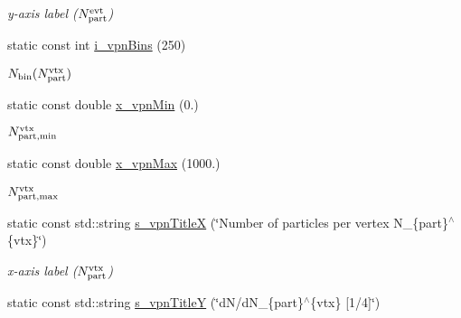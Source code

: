 \begin{CompactItemize}
\begin{CompactList}\small\item\em y-axis label ($N_{\rm part}^{\rm evt}$) \item\end{CompactList}\item 
\hypertarget{namespaceHistGroupCfg_9f8cb515970cf02b439c77ff897d597a}{
static const int \hyperlink{namespaceHistGroupCfg_9f8cb515970cf02b439c77ff897d597a}{i\_\-vpn\-Bins} (250)}
\label{namespaceHistGroupCfg_9f8cb515970cf02b439c77ff897d597a}

\begin{CompactList}\small\item\em $N_{\rm bin}(N_{\rm part}^{\rm vtx})$ \item\end{CompactList}\item 
\hypertarget{namespaceHistGroupCfg_19b5bad4a330ddd0dbd9217ecbcfa5b5}{
static const double \hyperlink{namespaceHistGroupCfg_19b5bad4a330ddd0dbd9217ecbcfa5b5}{x\_\-vpn\-Min} (0.)}
\label{namespaceHistGroupCfg_19b5bad4a330ddd0dbd9217ecbcfa5b5}

\begin{CompactList}\small\item\em $N_{\rm part,min}^{\rm vtx}$ \item\end{CompactList}\item 
\hypertarget{namespaceHistGroupCfg_b4b42b5798de2cd85787460c210358dc}{
static const double \hyperlink{namespaceHistGroupCfg_b4b42b5798de2cd85787460c210358dc}{x\_\-vpn\-Max} (1000.)}
\label{namespaceHistGroupCfg_b4b42b5798de2cd85787460c210358dc}

\begin{CompactList}\small\item\em $N_{\rm part,max}^{\rm vtx}$ \item\end{CompactList}\item 
\hypertarget{namespaceHistGroupCfg_f11cf889d3dba3a8b9907d7a9f643a1c}{
static const std::string \hyperlink{namespaceHistGroupCfg_f11cf889d3dba3a8b9907d7a9f643a1c}{s\_\-vpn\-Title\-X} (\char`\"{}Number of particles per vertex N\_\-\{part\}$^\wedge$\{vtx\}\char`\"{})}
\label{namespaceHistGroupCfg_f11cf889d3dba3a8b9907d7a9f643a1c}

\begin{CompactList}\small\item\em x-axis label ($N_{\rm part}^{\rm vtx}$) \item\end{CompactList}\item 
\hypertarget{namespaceHistGroupCfg_8007c9183dfc9349a26e0dc4a41bb0d1}{
static const std::string \hyperlink{namespaceHistGroupCfg_8007c9183dfc9349a26e0dc4a41bb0d1}{s\_\-vpn\-Title\-Y} (\char`\"{}d\-N/d\-N\_\-\{part\}$^\wedge$\{vtx\} \mbox{[}1/4\mbox{]}\char`\"{})}
\label{namespaceHistGroupCfg_8007c9183dfc9349a26e0dc4a41bb0d1}


\end{CompactItemize}
